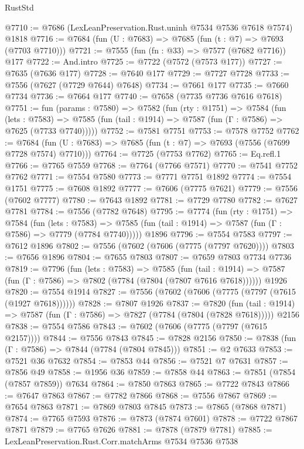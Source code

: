 \begin{lexlean}{RustStd}
\begin{coremodule}
{\begin{coremodule}
{{{{{{{{{{{{{{{{{{{{{{{{{{{{{{{{{{{{{{{{{{{@7710 := @7686 (LexLeanPreservation.Rust.uninh @7534 @7536 @7618 @7574) @1818
@7716 := @7684 (fun (U : @7683) => @7685 (fun (t : @7) => @7693 (@7703 @7710)))
@7721 := @7555 (fun (fn : @33) => @7577 (@7682 @7716)) @177
@7722 := And.intro
@7725 := @7722 (@7572 (@7573 @177))
@7727 := @7635 (@7636 @177)
@7728 := @7640 @177
@7729 := @7727 @7728
@7733 := @7556 (@7627 (@7729 @7644) @7648)
@7734 := @7661 @177
@7735 := @7660 @7734
@7736 := @7664 @177
@7740 := @7658 (@7735 @7736 @7616 @7618)
@7751 := fun (params : @7580) =>
  @7582
    (fun (rty : @1751) =>
    @7584
      (fun (lets : @7583) =>
      @7585 (fun (tail : @1914) => @7587 (fun (Γ : @7586) => @7625 (@7733 @7740)))))
@7752 := @7581 @7751
@7753 := @7578 @7752
@7762 := @7684 (fun (U : @7683) => @7685 (fun (t : @7) => @7693 (@7556 (@7699 @7728 @7574) @7710)))
@7764 := @7725 (@7753 @7762)
@7765 := Eq.refl.{1}
@7766 := @7765 @7559
@7768 := @7764 (@7766 @7571)
@7770 := @7541 @7752 @7762
@7771 := @7554 @7580
@7773 := @7771 @7751 @1892
@7774 := @7554 @1751
@7775 := @7608 @1892
@7777 := @7606 (@7775 @7621)
@7779 := @7556 (@7602 @7777)
@7780 := @7643 @1892
@7781 := @7729 @7780
@7782 := @7627 @7781
@7784 := @7556 (@7782 @7648)
@7795 := @7774
    (fun (rty : @1751) =>
    @7584
      (fun (lets : @7583) =>
      @7585 (fun (tail : @1914) => @7587 (fun (Γ : @7586) => @7779 (@7784 @7740)))))
    @1896
@7796 := @7554 @7583
@7797 := @7612 @1896
@7802 := @7556 (@7602 (@7606 (@7775 (@7797 @7620))))
@7803 := @7656 @1896
@7804 := @7655 @7803
@7807 := @7659 @7803 @7734 @7736
@7819 := @7796
    (fun (lets : @7583) =>
    @7585
      (fun (tail : @1914) => @7587 (fun (Γ : @7586) => @7802 (@7784 (@7804 (@7807 @7616 @7618))))))
    @1926
@7820 := @7554 @1914
@7827 := @7556 (@7602 (@7606 (@7775 (@7797 (@7615 (@1927 @7618))))))
@7828 := @7807 @1926
@7837 := @7820
    (fun (tail : @1914) => @7587 (fun (Γ : @7586) => @7827 (@7784 (@7804 (@7828 @7618)))))
    @2156
@7838 := @7554 @7586
@7843 := @7602 (@7606 (@7775 (@7797 (@7615 @2157))))
@7844 := @7556 @7843
@7845 := @7828 @2156
@7850 := @7838 (fun (Γ : @7586) => @7844 (@7784 (@7804 @7845)))
@7851 := @2 @7633
@7853 := @7521 @36 @7632
@7854 := @7853 @44
@7856 := @7521 @7 @7631
@7857 := @7856 @49
@7858 := @1956 @36
@7859 := @7858 @44
@7863 := @7851 (@7854 (@7857 @7859)) @7634
@7864 := @7850 @7863
@7865 := @7722 @7843
@7866 := @7647 @7863
@7867 := @7782 @7866
@7868 := @7556 @7867
@7869 := @7654 @7863
@7871 := @7869 @7803 @7845
@7873 := @7865 (@7868 @7871)
@7874 := @7765 @7593
@7876 := @7873 (@7874 @7601)
@7878 := @7722 @7867 @7871
@7879 := @7765 @7626
@7881 := @7878 (@7879 @7781)
@7885 := LexLeanPreservation.Rust.Corr.matchArms @7534 @7536 @7538
}}}}}}}}}}}}}}}}}}}}}}}}}}}}}}}}}}}}}}}}}}}
\end{coremodule}}
\end{coremodule}
\end{lexlean}
